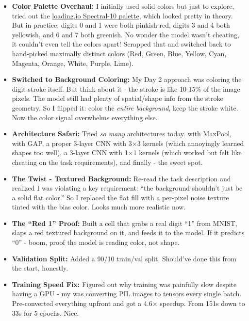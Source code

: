 \documentclass[9pt,a4paper,twocolumn,twoside]{tau-class/tau}
\begin{document}
        \begin{itemize}
            \item \textbf{Color Palette Overhaul:} I initially used solid colors but just to explore, tried out the \href{https://loading.io/color/feature/Spectral-10/}{loading.io Spectral-10 palette}, which looked pretty in theory. But in practice, digits 0 and 1 were both pinkish-red, digits 3 and 4 both yellowish, and 6 and 7 both greenish. No wonder the model wasn't cheating, it couldn't even tell the colors apart! Scrapped that and switched back to hand-picked maximally distinct colors (Red, Green, Blue, Yellow, Cyan, Magenta, Orange, White, Purple, Lime).

            \item \textbf{Switched to Background Coloring:} My Day 2 approach was coloring the digit stroke itself. But think about it - the stroke is like 10-15\% of the image pixels. The model still had plenty of spatial/shape info from the stroke geometry. So I flipped it: color the \textit{entire background}, keep the stroke white. Now the color signal overwhelms everything else.

            \item \textbf{Architecture Safari:} Tried \textit{so many} architectures today.  with MaxPool,  with GAP, a proper 3-layer CNN with 3$\times$3 kernels (which annoyingly learned shapes too well), a 3-layer CNN with 1$\times$1 kernels (which worked but felt like cheating on the task requirements), and finally  - the sweet spot.

            \item \textbf{The Twist - Textured Background:} Re-read the task description and realized I was violating a key requirement: ``the background shouldn't just be a solid flat color.'' So I replaced the flat fill with a per-pixel noise texture tinted with the bias color. Looks much more realistic now.

            \item \textbf{The ``Red 1'' Proof:} Built a cell that grabs a real digit ``1'' from MNIST, slaps a red textured background on it, and feeds it to the model. If it predicts ``0'' - boom, proof the model is reading color, not shape.

            \item \textbf{Validation Split:} Added a 90/10 train/val split. Should've done this from the start, honestly.

            \item \textbf{Training Speed Fix:} Figured out why training was painfully slow despite having a GPU - my  was converting PIL images to tensors every single batch. Pre-converted everything upfront and got a 4.6$\times$ speedup. From 151s down to 33s for 5 epochs. Nice.
        \end{itemize}
\end{document}
